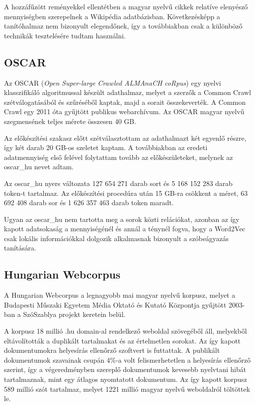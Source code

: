 A hozzáfűzött reményekkel ellentétben a magyar nyelvű cikkek relatíve elenyésző mennyiségben szerepelnek a Wikipédia adatbázisban. Következésképp a tanítóhalmaz nem bizonyult elegendőnek, így a továbbiakban csak a különböző technikák tesztelésére tudtam használni.


\subsection{OSCAR}

Az OSCAR (\textit{Open Super-large Crawled ALMAnaCH coRpus}) egy nyelvi klasszifikáló algoritmussal készült adathalmaz, melyet a szerzők a Common Crawl szétválogatásából és szűréséből kaptak, majd a sorait összekeverték. A Common Crawl egy 2011 óta gyűjtött publikus webarchívum. Az OSCAR magyar nyelvű szegmensének teljes mérete összesen 40 GB. 

Az előkészítési szakasz előtt szétválasztottam az adathalmazt két egyenlő részre, így két darab 20 GB-os szeletet kaptam. A továbbiakban az eredeti adatmennyiség első felével folytattam tovább az előkészületeket, melynek az oscar\_hu nevet adtam.

Az oscar\_hu nyers változata 127 654 271 darab sort és 5 168 152 283 darab token-t tartalmaz. Az előkészítési procedúra után 15 GB-ra csökkent a méret, 63 692 408 darab sor és 1 626 357 463 darab token maradt.

Ugyan az oscar\_hu nem tartotta meg a sorok közti relációkat, azonban az így kapott adatsokaság a mennyiségénél és annál a ténynél fogva, hogy a Word2Vec csak lokális információkkal dolgozik alkalmasnak bizonyult a szóbeágyazás tanítására.

\subsection{Hungarian Webcorpus}

A Hungarian Webcorpus a legnagyobb mai magyar nyelvű korpusz, melyet a Budapesti Műszaki Egyetem Média Oktató és Kutató Központja gyűjtött 2003-ban a SzóSzablya projekt keretein belül.

A korpusz 18 millió .hu domain-al rendelkező weboldal szövegéből áll, melyekből eltávolították a duplikált tartalmakat és az értelmetlen sorokat. Az így kapott dokumentumokra helyesírás ellenőrző szoftvert is futtattak. A publikált dokumentumok szavainak csupán 4\%-a volt felismerhetetlen a helyesírás ellenőrző szerint, így a végeredményben szereplő dokumentumok kevesebb nyelvtani hibát tartalmaznak, mint egy átlagos nyomtatott dokumentum. Az így kapott korpusz 589 millió szót tartalmaz, melyet 1221 millió magyar nyelvű weboldalról töltöttek le.

